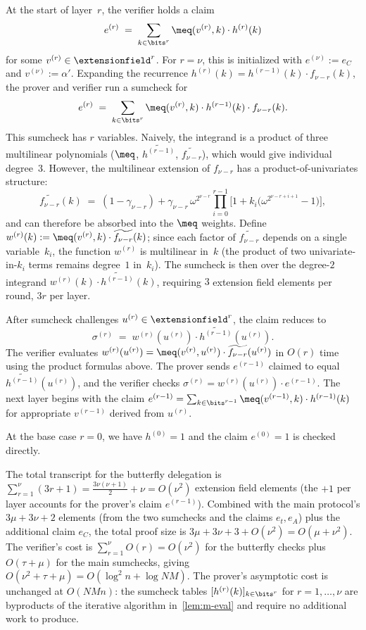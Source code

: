  At the start of layer~$r$, the verifier holds a claim
\[
    e^{(r)} \;=\; \sum_{k \in \bits^r} \meq(v^{(r)}, k) \cdot h^{(r)}(k)
\]
for some $v^{(r)} \in \extensionfield^r$.
For $r = \nu$, this is initialized with $e^{(\nu)} := e_C$ and $v^{(\nu)} := \alpha'$.
Expanding the recurrence $h^{(r)}(k) = h^{(r-1)}(k) \cdot f_{\nu-r}(k)$, the prover and verifier run a sumcheck for
\[
    e^{(r)} \;=\; \sum_{k \in \bits^r} \meq(v^{(r)}, k) \cdot h^{(r-1)}(k) \cdot f_{\nu-r}(k).
\]
This sumcheck has $r$ variables.
Naively, the integrand is a product of three multilinear polynomials ($\meq$, $\widetilde{h^{(r-1)}}$, $\widetilde{f_{\nu-r}}$), which would give individual degree~$3$.
However, the multilinear extension of $f_{\nu-r}$ has a product-of-univariates structure:
\[
    \widetilde{f_{\nu-r}}(k) \;=\; (1-\gamma_{\nu-r}) + \gamma_{\nu-r}\, \omega^{2^{\nu-r}} \prod_{i=0}^{r-1}\Big[1 + k_i\big(\omega^{2^{\nu-r+i+1}} - 1\big)\Big],
\]
and can therefore be absorbed into the $\meq$ weights.
Define $w^{(r)}(k) := \meq(v^{(r)}, k) \cdot \widetilde{f_{\nu-r}}(k)$; since each factor of $\widetilde{f_{\nu-r}}$ depends on a single variable~$k_i$, the function $w^{(r)}$ is multilinear in~$k$ (the product of two univariate-in-$k_i$ terms remains degree~$1$ in~$k_i$).
The sumcheck is then over the degree-$2$ integrand $w^{(r)}(k) \cdot \widetilde{h^{(r-1)}}(k)$, requiring $3$ extension field elements per round, $3r$ per layer.

After sumcheck challenges $u^{(r)} \in \extensionfield^r$, the claim reduces to
\[
    \sigma^{(r)} \;=\; w^{(r)}(u^{(r)}) \cdot \widetilde{h^{(r-1)}}(u^{(r)}).
\]
The verifier evaluates $w^{(r)}(u^{(r)}) = \meq(v^{(r)}, u^{(r)}) \cdot \widetilde{f_{\nu-r}}(u^{(r)})$ in $O(r)$ time using the product formulas above.
The prover sends $e^{(r-1)}$ claimed to equal $\widetilde{h^{(r-1)}}(u^{(r)})$, and the verifier checks $\sigma^{(r)} = w^{(r)}(u^{(r)}) \cdot e^{(r-1)}$.
The next layer begins with the claim $e^{(r-1)} = \sum_{k \in \bits^{r-1}} \meq(v^{(r-1)}, k) \cdot h^{(r-1)}(k)$ for appropriate $v^{(r-1)}$ derived from $u^{(r)}$.

At the base case $r = 0$, we have $h^{(0)} = 1$ and the claim $e^{(0)} = 1$ is checked directly.

 The total transcript for the butterfly delegation is $\sum_{r=1}^{\nu} (3r + 1) = \frac{3\nu(\nu+1)}{2} + \nu = O(\nu^2)$ extension field elements (the $+1$ per layer accounts for the prover's claim $e^{(r-1)}$).
Combined with the main protocol's $3\mu + 3\nu + 2$ elements (from the two sumchecks and the claims $e_t, e_A$) plus the additional claim $e_C$, the total proof size is $3\mu + 3\nu + 3 + O(\nu^2) = O(\mu + \nu^2)$.
The verifier's cost is $\sum_{r=1}^{\nu} O(r) = O(\nu^2)$ for the butterfly checks plus $O(\tau + \mu)$ for the main sumchecks, giving $O(\nu^2 + \tau + \mu) = O(\log^2 n + \log NM)$.
The prover's asymptotic cost is unchanged at $O(NMn)$: the sumcheck tables $[h^{(r)}(k)]_{k \in \bits^r}$ for $r = 1, \ldots, \nu$ are byproducts of the iterative algorithm in~\cref{lem:m-eval} and require no additional work to produce.